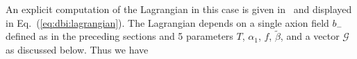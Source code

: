 \documentclass[12pt]{article}
\begin{document}
An explicit computation of the Lagrangian in this case is given in~\cite{Nath:2018xxe} and displayed in Eq.~(\ref{eq:dbi:lagrangian}).
The Lagrangian depends on a single axion field $b_-$ defined as in the preceding sections and 5 parameters $T$, $\alpha_1$, $f$, $\tilde\beta$, and a vector $\mathcal{G}$ as discussed below.
Thus we have



%

\end{document}
